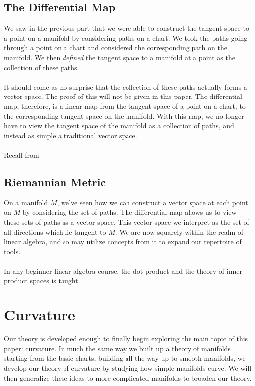 \documentclass[]{article}
\newcommand\<{\ensuremath{\left\langle}}
\renewcommand\>{\ensuremath{\right\rangle}}
\theoremstyle{definition}
\theoremstyle{definition}
\begin{document}
	\subsection*{The Differential Map}
	We saw in the previous part that we were able to construct the tangent space to a point on a manifold by considering paths on a chart. We took the paths going through a point on a chart and considered the corresponding path on the manifold. We then \textit{defined} the tangent space to a manifold at a point as the collection of these paths.\\
	\\
	It should come as no surprise that the collection of these paths actually forms a vector space. The proof of this will not be given in this paper. The differential map, therefore, is a linear map from the tangent space of a point on a chart, to the corresponding tangent space on the manifold. With this map, we no longer have to view the tangent space of the manifold as a collection of paths, and instead as simple a traditional vector space.\\
	\\
	Recall from 
	
	
	\subsection*{Riemannian Metric}
	On a manifold $M$, we've seen how we can construct a vector space at each point on $M$ by considering the set of paths. The differential map allows us to view these sets of paths as a vector space. This vector space we interpret as the set of all directions which lie tangent to $M$. We are now squarely within the realm of linear algebra, and so may utilize concepts from it to expand our repertoire of tools.\\
	\\
	In any beginner linear algebra course, the dot product and the theory of inner product spaces is taught.  
	

	
	
	\newpage
	\section{Curvature}
	Our theory is developed enough to finally begin exploring the main topic of this paper: curvature. In much the same way we built up a theory of manifolds starting from the basic charts, building all the way up to smooth manifolds, we develop our theory of curvature by studying how simple manifolds curve. We will then generalize these ideas to more complicated manifolds to broaden our theory. 
	
\end{document}
